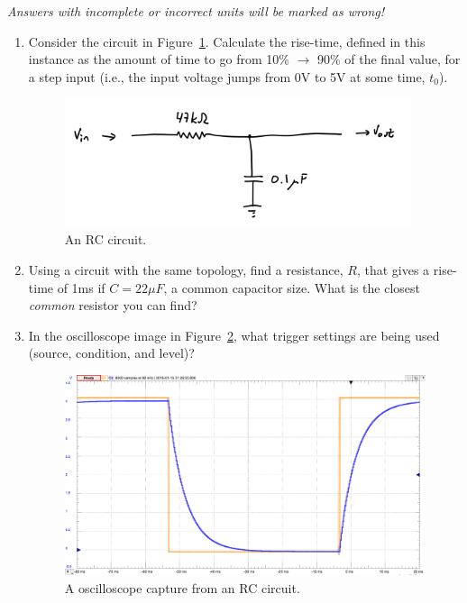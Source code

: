 \documentclass[11pt]{article} %
\begin{document}
\emph{Answers with incomplete or incorrect units will be marked as wrong!}

\begin{enumerate}
\item Consider the circuit in Figure~\ref{fig:rc.prelab}. Calculate the rise-time, defined in this instance as the amount of time to go from 10\% $\rightarrow$ 90\% of the final value, for a step input (i.e., the input voltage jumps from 0V to 5V at some time, $t_0$).
\vspace{1in}
\begin{figure}[htbp]
\begin{center}
\includegraphics[width=4in]{figures/rc_prelab}
\caption{An RC circuit.}
\label{fig:rc.prelab}
\end{center}
\end{figure}

\item Using a circuit with the same topology, find a resistance, $R$, that gives a rise-time of 1ms if $C=22\mu F$, a common capacitor size. What is the closest \emph{common} resistor you can find?
\vspace{1in}
\item In the oscilloscope image in Figure~\ref{fig:trigger}, what trigger settings are being used (source, condition, and level)?
\vspace{0.75in}

\begin{figure}[htbp]
\begin{center}
\includegraphics[width=\textwidth]{figures/rc_capture}
\caption{A oscilloscope capture from an RC circuit.}
\label{fig:trigger}
\end{center}
\end{figure}
\end{enumerate}
\end{document}
